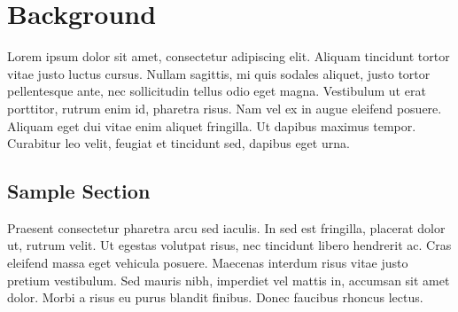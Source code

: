 \chapter{Background}\label{ch:background}

Lorem ipsum dolor sit amet, consectetur adipiscing elit. Aliquam tincidunt tortor vitae justo luctus cursus. Nullam sagittis, mi quis sodales aliquet, justo tortor pellentesque ante, nec sollicitudin tellus odio eget magna. Vestibulum ut erat porttitor, rutrum enim id, pharetra risus. Nam vel ex in augue eleifend posuere. Aliquam eget dui vitae enim aliquet fringilla. Ut dapibus maximus tempor. Curabitur leo velit, feugiat et tincidunt sed, dapibus eget urna. 

\section{Sample Section}

Praesent consectetur pharetra arcu sed iaculis. In sed est fringilla, placerat dolor ut, rutrum velit. Ut egestas volutpat risus, nec tincidunt libero hendrerit ac. Cras eleifend massa eget vehicula posuere. Maecenas interdum risus vitae justo pretium vestibulum. Sed mauris nibh, imperdiet vel mattis in, accumsan sit amet dolor. Morbi a risus eu purus blandit finibus. Donec faucibus rhoncus lectus. 
